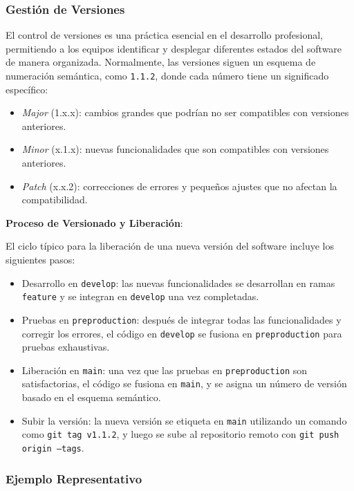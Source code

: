 \documentclass{template/uem_theme}
\begin{document}
\subsubsection{Gestión de Versiones}

El control de versiones es una práctica esencial en el desarrollo profesional, permitiendo a los equipos identificar y desplegar diferentes estados del software de manera organizada. Normalmente, las versiones siguen un esquema de numeración semántica, como \texttt{1.1.2}, donde cada número tiene un significado específico:

\begin{itemize}
    \item \textit{Major} (1.x.x): cambios grandes que podrían no ser compatibles con versiones anteriores.
    \item \textit{Minor} (x.1.x): nuevas funcionalidades que son compatibles con versiones anteriores.
    \item \textit{Patch} (x.x.2): correcciones de errores y pequeños ajustes que no afectan la compatibilidad.
\end{itemize}

\textbf{Proceso de Versionado y Liberación}:

El ciclo típico para la liberación de una nueva versión del software incluye los siguientes pasos:

\begin{itemize}
    \item Desarrollo en \texttt{develop}: las nuevas funcionalidades se desarrollan en ramas \texttt{feature} y se integran en \texttt{develop} una vez completadas.
    \item Pruebas en \texttt{preproduction}: después de integrar todas las funcionalidades y corregir los errores, el código en \texttt{develop} se fusiona en \texttt{preproduction} para pruebas exhaustivas.
    \item Liberación en \texttt{main}: una vez que las pruebas en \texttt{preproduction} son satisfactorias, el código se fusiona en \texttt{main}, y se asigna un número de versión basado en el esquema semántico.
    \item Subir la versión: la nueva versión se etiqueta en \texttt{main} utilizando un comando como \texttt{git tag v1.1.2}, y luego se sube al repositorio remoto con \texttt{git push origin --tags}.
\end{itemize}

\subsubsection{Ejemplo Representativo}
\end{document}
